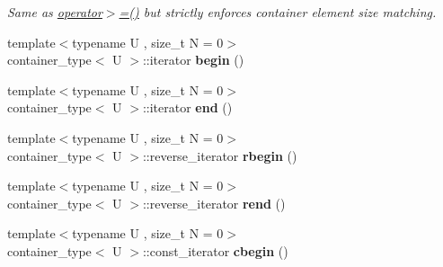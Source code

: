 \begin{DoxyCompactItemize}
\begin{DoxyCompactList}\small\item\em Same as \hyperlink{classheterogeneous_1_1heterodeque_3_01_t_00_01_types_8_8_8_4_a1277be24def4b98760aa9649536d7268}{operator$>$=()} but strictly enforces container element size matching. \end{DoxyCompactList}\item 
\hypertarget{classheterogeneous_1_1heterodeque_3_01_t_00_01_types_8_8_8_4_ae4fc04b3ce904f0402e6520f9bf2710d}{}{\footnotesize template$<$typename U , size\+\_\+t N = 0$>$ }\\container\+\_\+type$<$ U $>$\+::iterator {\bfseries begin} ()\label{classheterogeneous_1_1heterodeque_3_01_t_00_01_types_8_8_8_4_ae4fc04b3ce904f0402e6520f9bf2710d}

\item 
\hypertarget{classheterogeneous_1_1heterodeque_3_01_t_00_01_types_8_8_8_4_a6463aeed9fba3b4e14808db5101ccabb}{}{\footnotesize template$<$typename U , size\+\_\+t N = 0$>$ }\\container\+\_\+type$<$ U $>$\+::iterator {\bfseries end} ()\label{classheterogeneous_1_1heterodeque_3_01_t_00_01_types_8_8_8_4_a6463aeed9fba3b4e14808db5101ccabb}

\item 
\hypertarget{classheterogeneous_1_1heterodeque_3_01_t_00_01_types_8_8_8_4_ab1f3885d73a259420cefbd7477e027e1}{}{\footnotesize template$<$typename U , size\+\_\+t N = 0$>$ }\\container\+\_\+type$<$ U $>$\+::reverse\+\_\+iterator {\bfseries rbegin} ()\label{classheterogeneous_1_1heterodeque_3_01_t_00_01_types_8_8_8_4_ab1f3885d73a259420cefbd7477e027e1}

\item 
\hypertarget{classheterogeneous_1_1heterodeque_3_01_t_00_01_types_8_8_8_4_a5d2353582249213a43028e5df971cedd}{}{\footnotesize template$<$typename U , size\+\_\+t N = 0$>$ }\\container\+\_\+type$<$ U $>$\+::reverse\+\_\+iterator {\bfseries rend} ()\label{classheterogeneous_1_1heterodeque_3_01_t_00_01_types_8_8_8_4_a5d2353582249213a43028e5df971cedd}

\item 
\hypertarget{classheterogeneous_1_1heterodeque_3_01_t_00_01_types_8_8_8_4_a7378570cff60beb97ddbe2489bbf3d03}{}{\footnotesize template$<$typename U , size\+\_\+t N = 0$>$ }\\container\+\_\+type$<$ U $>$\+::const\+\_\+iterator {\bfseries cbegin} ()\label{classheterogeneous_1_1heterodeque_3_01_t_00_01_types_8_8_8_4_a7378570cff60beb97ddbe2489bbf3d03}


\end{DoxyCompactItemize}
